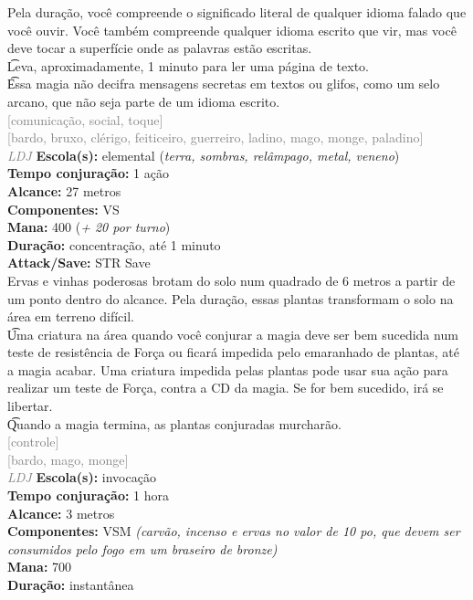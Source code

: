 \documentclass{RPG_Adventure}[2021/10/20]
\begin{document}
{\normalsize Pela duração, você compreende o significado literal de qualquer idioma falado que você ouvir. Você também compreende qualquer idioma escrito que vir, mas você deve tocar a superfície onde as palavras estão escritas.\\\t Leva, aproximadamente, 1 minuto para ler uma página de texto.\\\t Essa magia não decifra mensagens secretas em textos ou glifos, como um selo arcano, que não seja parte de um idioma escrito.\\}
{\scriptsize \textcolor{gray}{[comunicação, social, toque]\\}}
{\scriptsize \textcolor{gray}{[bardo, bruxo, clérigo, feiticeiro, guerreiro, ladino, mago, monge, paladino]\\}}
{\tiny \textcolor{gray}{\textit{LDJ}}}
{\small \t \textbf{Escola(s):} elemental (\textit{terra, sombras, relâmpago, metal, veneno})\\\t \textbf{Tempo conjuração:} 1 ação\\\t \textbf{Alcance:} 27 metros\\\t \textbf{Componentes:} VS\\\t \textbf{Mana:} 400 (\textit{+ 20 por turno})\\\t \textbf{Duração:} concentração, até 1 minuto\\\t \textbf{Attack/Save:} STR Save\\}
{\normalsize Ervas e vinhas poderosas brotam do solo num quadrado de 6 metros a partir de um ponto dentro do alcance. Pela duração, essas plantas transformam o solo na área em terreno difícil.\\\t Uma criatura na área quando você conjurar a magia deve ser bem sucedida num teste de resistência de Força ou ficará impedida pelo emaranhado de plantas, até a magia acabar. Uma criatura impedida pelas plantas pode usar sua ação para realizar um teste de Força, contra a CD da magia. Se for bem sucedido, irá se libertar.\\\t Quando a magia termina, as plantas conjuradas murcharão.\\}
{\scriptsize \textcolor{gray}{[controle]\\}}
{\scriptsize \textcolor{gray}{[bardo, mago, monge]\\}}
{\tiny \textcolor{gray}{\textit{LDJ}}}
{\small \t \textbf{Escola(s):} invocação\\\t \textbf{Tempo conjuração:} 1 hora\\\t \textbf{Alcance:} 3 metros\\\t \textbf{Componentes:} VSM \textit{(carvão, incenso e ervas no valor de 10 po, que devem ser consumidos pelo fogo em um braseiro de bronze)}\\\t \textbf{Mana:} 700\\\t \textbf{Duração:} instantânea\\}
\end{document}
